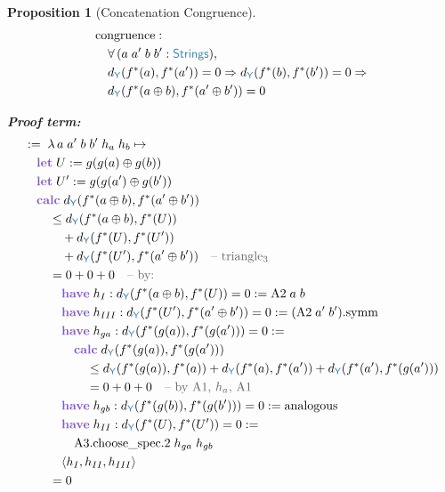 \documentclass[11pt]{article}
\theoremstyle{definition}
\theoremstyle{plain}
\newtheorem{propenv}{Proposition}
\newcommand{\kw}[1]{\textcolor{keyword}{\textbf{#1}}}
\newcommand{\ty}[1]{\textcolor{type}{\mathsf{#1}}}
\newcommand{\fn}[1]{\mathrm{#1}}
\newcommand{\cmt}[1]{\textcolor{comment}{\text{-- #1}}}
\newcommand{\lam}{\lambda\,}
\newcommand{\all}{\forall\,}
\newcommand{\Arr}{\Rightarrow}
\newcommand{\pf}{:=\;}
\newcommand{\Strings}{\ty{Strings}}
\newcommand{\Y}{\ty{Y}}
\newcommand{\fstar}{f^*}
\newcommand{\dY}{d_{\Y}}
\newcommand{\concat}{\oplus}
\begin{document}
\begin{propenv}[Concatenation Congruence]
\label{prop:congruence}
\begin{align*}
&\fn{congruence} : \\
&\quad \all (a\; a'\; b\; b' : \Strings), \\
&\quad \dY(\fstar(a), \fstar(a')) = 0 \Arr \dY(\fstar(b), \fstar(b')) = 0 \Arr \\
&\quad \dY(\fstar(a \concat b), \fstar(a' \concat b')) = 0
\end{align*}

\textbf{Proof term:}
\begin{align*}
&\pf \lam a\; a'\; b\; b'\; h_a\; h_b \mapsto \\
&\quad \kw{let}\; U := g(g(a) \concat g(b)) \\
&\quad \kw{let}\; U' := g(g(a') \concat g(b')) \\
&\quad \kw{calc}\; \dY(\fstar(a \concat b), \fstar(a' \concat b')) \\
&\quad\quad \leq \dY(\fstar(a \concat b), \fstar(U)) \\
&\quad\quad\quad + \dY(\fstar(U), \fstar(U')) \\
&\quad\quad\quad + \dY(\fstar(U'), \fstar(a' \concat b')) \quad\cmt{triangle$_3$} \\
&\quad\quad = 0 + 0 + 0 \quad\cmt{by:} \\
&\quad\quad\quad \kw{have}\; h_I : \dY(\fstar(a \concat b), \fstar(U)) = 0 := \fn{A2}\; a\; b \\
&\quad\quad\quad \kw{have}\; h_{III} : \dY(\fstar(U'), \fstar(a' \concat b')) = 0 := (\fn{A2}\; a'\; b').\fn{symm} \\
&\quad\quad\quad \kw{have}\; h_{ga} : \dY(\fstar(g(a)), \fstar(g(a'))) = 0 := \\
&\quad\quad\quad\quad \kw{calc}\; \dY(\fstar(g(a)), \fstar(g(a'))) \\
&\quad\quad\quad\quad\quad \leq \dY(\fstar(g(a)), \fstar(a)) + \dY(\fstar(a), \fstar(a')) + \dY(\fstar(a'), \fstar(g(a'))) \\
&\quad\quad\quad\quad\quad = 0 + 0 + 0 \quad\cmt{by A1, $h_a$, A1} \\
&\quad\quad\quad \kw{have}\; h_{gb} : \dY(\fstar(g(b)), \fstar(g(b'))) = 0 := \text{analogous} \\
&\quad\quad\quad \kw{have}\; h_{II} : \dY(\fstar(U), \fstar(U')) = 0 := \\
&\quad\quad\quad\quad \fn{A3}.\fn{choose\_spec}.2\; h_{ga}\; h_{gb} \\
&\quad\quad\quad \langle h_I, h_{II}, h_{III} \rangle \\
&\quad\quad = 0
\end{align*}
\end{propenv}
\end{document}
